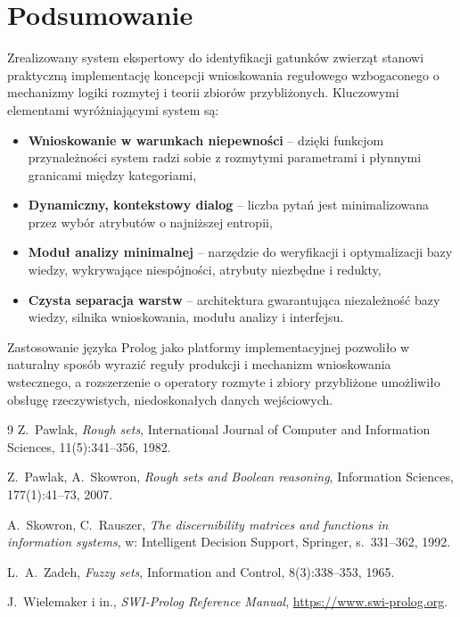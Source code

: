 \documentclass[11pt,a4paper]{article}
\begin{document}
\section{Podsumowanie}
Zrealizowany system ekspertowy do identyfikacji gatunków zwierząt stanowi
praktyczną implementację koncepcji wnioskowania regułowego wzbogaconego
o mechanizmy logiki rozmytej i teorii zbiorów przybliżonych. Kluczowymi
elementami wyróżniającymi system są:
\begin{itemize}[noitemsep]
    \item \textbf{Wnioskowanie w warunkach niepewności} -- dzięki funkcjom
          przynależności system radzi sobie z rozmytymi parametrami i płynnymi
          granicami między kategoriami,
    \item \textbf{Dynamiczny, kontekstowy dialog} -- liczba pytań jest
          minimalizowana przez wybór atrybutów o najniższej entropii,
    \item \textbf{Moduł analizy minimalnej} -- narzędzie do weryfikacji
          i optymalizacji bazy wiedzy, wykrywające niespójności, atrybuty
          niezbędne i redukty,
    \item \textbf{Czysta separacja warstw} -- architektura gwarantująca
          niezależność bazy wiedzy, silnika wnioskowania, modułu analizy
          i interfejsu.
\end{itemize}

Zastosowanie języka Prolog jako platformy implementacyjnej pozwoliło w naturalny
sposób wyrazić reguły produkcji i mechanizm wnioskowania wstecznego, a rozszerzenie
o operatory rozmyte i zbiory przybliżone umożliwiło obsługę rzeczywistych,
niedoskonałych danych wejściowych.

\begin{thebibliography}{9}
Z.~Pawlak,
\textit{Rough sets},
International Journal of Computer and Information Sciences, 11(5):341--356, 1982.

Z.~Pawlak, A.~Skowron,
\textit{Rough sets and Boolean reasoning},
Information Sciences, 177(1):41--73, 2007.

A.~Skowron, C.~Rauszer,
\textit{The discernibility matrices and functions in information systems},
w: Intelligent Decision Support, Springer, s.~331--362, 1992.

L.~A.~Zadeh,
\textit{Fuzzy sets},
Information and Control, 8(3):338--353, 1965.

J.~Wielemaker i in.,
\textit{SWI-Prolog Reference Manual},
\url{https://www.swi-prolog.org}.
\end{thebibliography}
\end{document}

